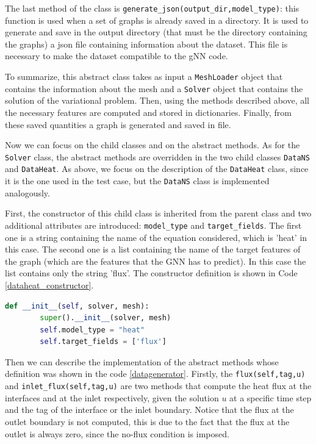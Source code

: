 \documentclass[11pt,a4paper]{article}
\begin{document}
The last method of the class is \texttt{generate\_json(output\_dir,model\_type)}: this function is used when a set of graphs is already saved in a directory. It is used to generate and save in the output directory (that must be the directory containing the graphs) a json file containing information about the dataset. This file is necessary to make the dataset compatible to the gNN code. 

To summarize, this abstract class takes as input a \texttt{MeshLoader} object that contains the information about the mesh and a \texttt{Solver} object that contains the solution of the variational problem. Then, using the methods described above, all the necessary features are computed and stored in dictionaries. Finally, from these saved quantities a graph is generated and saved in file. 

Now we can focus on the child classes and on the abstract methods.
As for the \texttt{Solver} class, the abstract methods are overridden in the two child classes \texttt{DataNS} and \texttt{DataHeat}. 
As above, we focus on the description of the \texttt{DataHeat} class, since it is the one used in the test case, but the \texttt{DataNS} class is implemented analogously. 

First, the constructor of this child class is inherited from the parent class and two additional attributes are introduced: \texttt{model\_type} and \texttt{target\_fields}. The first one is a string containing the name of the equation considered, which is 'heat' in this case. The second one is a list containing the name of the target features of the graph (which are the features that the GNN has to predict). In this case the list contains only the string 'flux'. The constructor definition is shown in Code \ref{dataheat_constructor}.

\begin{lstlisting}[language=Python, caption={Solver class.}, label={dataheat_constructor}]
    def __init__(self, solver, mesh):
        super().__init__(solver, mesh)
        self.model_type = "heat"
        self.target_fields = ['flux']
\end{lstlisting}

Then we can describe the implementation of the abstract methods whose definition was shown in the code \ref{datagenerator}. 
Firstly, the \texttt{flux(self,tag,u)} and \texttt{inlet\_flux(self,tag,u)} are two methods that compute the heat flux at the interfaces and at the inlet respectively, given the solution \(u\) at a specific time step and the tag of the interface or the inlet boundary. Notice that the flux at the outlet boundary is not computed, this is due to the fact that the flux at the outlet is always zero, since the no-flux condition is imposed. 
\end{document}
